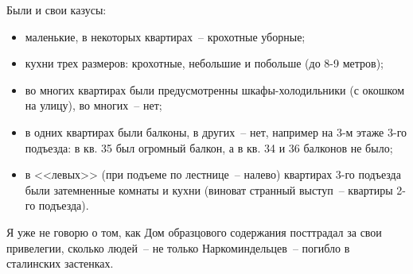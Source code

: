 Были и свои казусы:
\begin{itemize}
\item маленькие, в некоторых квартирах~-- крохотные уборные;
\item кухни трех размеров: крохотные, небольшие и побольше (до 8-9 метров);
\item во многих квартирах были предусмотренны шкафы-холодильники (с окошком на улицу), во многих~-- нет;
\item в одних квартирах были балконы, в других~-- нет, например на 3-м этаже 3-го подъезда: в кв. 35 был огромный балкон, а в кв. 34 и 36 балконов не было;
\item в <<левых>> (при подъеме по лестнице~-- налево) квартирах 3-го подъезда были затемненные комнаты и кухни (виноват странный выступ~-- квартиры 2-го подъезда). 
\end{itemize}

Я уже не говорю о том, как Дом образцового содержания посттрадал за свои привелегии, сколько людей~-- не только Наркоминдельцев~-- погибло в сталинских застенках.
